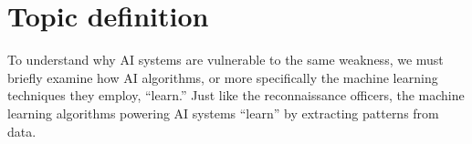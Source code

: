 \section{Topic definition}\label{sec:topic-definition}

To understand why AI systems are vulnerable to the same weakness, we
must briefly examine how AI algorithms, or more specifically the machine
learning techniques they employ, “learn.” Just like the reconnaissance officers, the machine learning algorithms powering AI systems “learn” by
extracting patterns from data. 